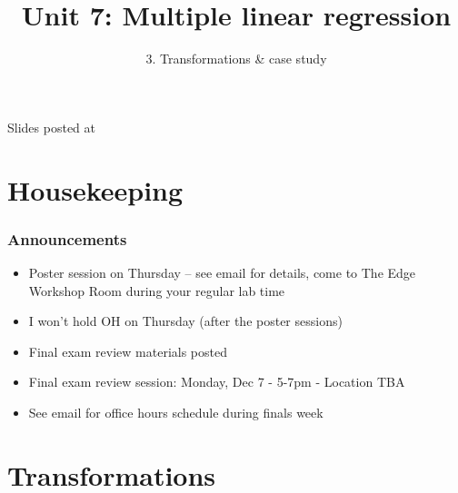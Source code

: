 \documentclass[11pt,containsverbatim,handout,xcolor=xelatex,dvipsnames,table]{beamer}
\title{Unit 7: Multiple linear regression}
\subtitle{3. Transformations \& case study}
\author{\CourseName}
\date{}
\institute{\InstituteName}
\begin{document}



\begin{frame}[plain]

\titlepage

\vfill

{\scriptsize {} \hfill Slides posted at  \webURL{\CourseSite}}

\addtocounter{framenumber}{-1} 

\end{frame}


\section{Housekeeping}


\begin{frame}
\frametitle{Announcements}

\begin{itemize}

\item Poster session on Thursday -- see email for details, come to The Edge Workshop Room during
your regular lab time

\item I won't hold OH on Thursday (after the poster sessions)

\item Final exam review materials posted

\item Final exam review session:  Monday, Dec 7 - 5-7pm - Location TBA

\item See email for office hours schedule during finals week

\end{itemize}

\end{frame}


\section{Transformations}

\end{document}
